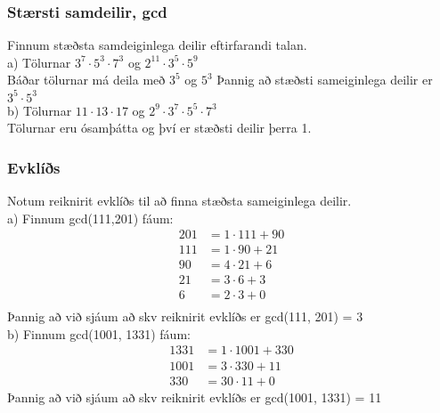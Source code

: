 \subsubsection{Stærsti samdeilir, gcd}
Finnum stæðsta samdeiginlega deilir eftirfarandi talan.\\
a) Tölurnar $3^7 \cdot 5^3 \cdot 7^3$ og $2^{11} \cdot 3^5 \cdot 5^9$\\
Báðar tölurnar má deila með $3^5$ og $5^3$ Þannig að stæðsti sameiginlega deilir er $3^5 \cdot 5^3$\\
b) Tölurnar $11 \cdot 13 \cdot 17$ og $2^9 \cdot 3^7 \cdot 5^5 \cdot 7^3$\\
Tölurnar eru ósamþátta og því er stæðsti deilir þerra 1.
\subsubsection{Evklíðs}
Notum reiknirit evklíðs til að finna stæðsta sameiginlega deilir.\\
a) Finnum gcd(111,201) fáum:
\vspace*{-1em}\begin{align*}
    201 &= 1 \cdot 111 + 90 \\
    111 &= 1 \cdot 90 + 21 \\
    90 &= 4 \cdot 21 + 6 \\
    21 &= 3 \cdot 6 + 3 \\
    6 &= 2 \cdot 3 + 0 \\
\end{align*}Þannig að við sjáum að skv reiknirit evklíðs er gcd(111, 201) = 3\\
b) Finnum gcd(1001, 1331) fáum:
\vspace*{-1em}\begin{align*}
    1331 &= 1 \cdot 1001 + 330 \\
    1001 &= 3 \cdot 330 + 11 \\
    330 &= 30 \cdot 11 + 0 
\end{align*}
Þannig að við sjáum að skv reiknirit evklíðs er gcd(1001, 1331) = 11\\

\newpage
\setcounter{subsection}{4}
